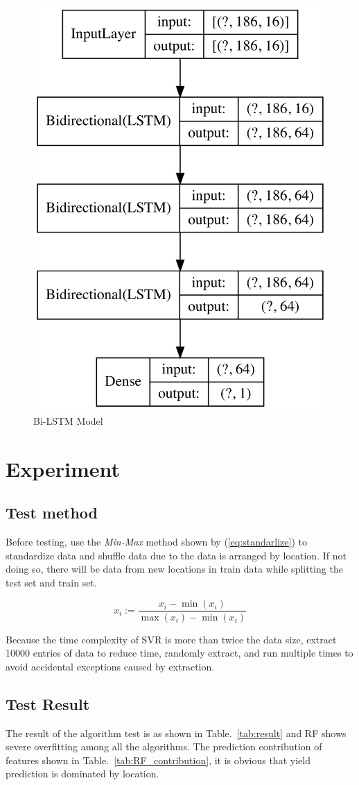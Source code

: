 \documentclass[conference, a4paper]{IEEEtran}
\begin{document}
      \begin{figure}[htbp]
        \centerline{\includegraphics[width=0.4\linewidth]{figures/Model_figure.png}}
        \caption{Bi-LSTM Model}
        \label{fig:model}
      \end{figure}


\section{Experiment} \label{sec:ex}
\subsection{Test method}
  Before testing, use the \textit{Min-Max} method shown by (\ref{eq:standarlize}) to standardize data and shuffle data due to the data is arranged by location. If not doing so, there will be data from new locations in train data while splitting the test set and train set.

  \begin{equation}
    x_i := \frac{x_i-\min \left( x_i \right)}{\max \left( x_i \right) -\min \left( x_i \right)}
  \label{eq:standarlize}
  \end{equation}

  Because the time complexity of SVR is more than twice the data size\cite{clarke2005analysis}, extract 10000 entries of data to reduce time, randomly extract, and run multiple times to avoid accidental exceptions caused by extraction.



\subsection{Test Result}
  The result of the algorithm test is as shown in Table.~\ref{tab:result} and RF shows severe overfitting among all the algorithms. The prediction contribution of features shown in Table.~\ref{tab:RF_contribution}, it is obvious that yield prediction is dominated by location.
\end{document}
